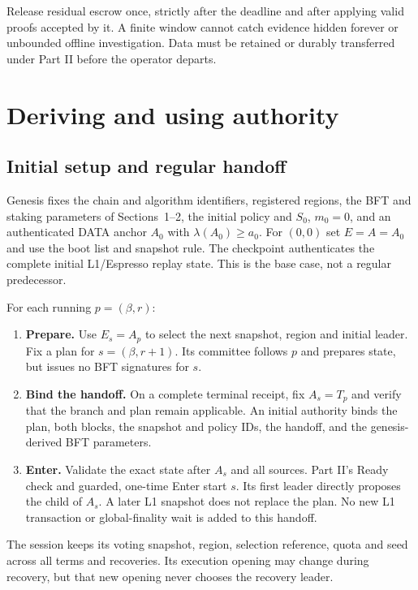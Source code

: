\documentclass[11pt,a4paper]{article}
\begin{document}
Release residual escrow once, strictly after the deadline and after
applying valid proofs accepted by it. A finite window cannot catch evidence
hidden forever or unbounded offline investigation. Data must be retained
or durably transferred under Part II before the operator departs.

\newpage
\section{Deriving and using authority}
\label{sec:authority}
\subsection{Initial setup and regular handoff}
Genesis fixes the chain and algorithm identifiers, registered regions,
the BFT and staking parameters of Sections~1--2, the initial policy and
$S_0$, $m_0=0$, and an authenticated DATA anchor $A_0$ with
$\lambda(A_0)\ge a_0$. For $(0,0)$ set $E=A=A_0$ and use the boot list
and snapshot rule. The checkpoint authenticates the complete initial
L1/Espresso replay state. This is the base case, not a regular predecessor.

For each running $p=(\beta,r)$:
\begin{enumerate}[label=\textbf{\arabic*.},itemsep=4pt]
\item \textbf{Prepare.} Use $E_s=A_p$ to select the next snapshot, region
and initial leader. Fix a plan for $s=(\beta,r+1)$. Its committee follows
$p$ and prepares state, but issues no BFT signatures for $s$.
\item \textbf{Bind the handoff.} On a complete terminal receipt, fix
$A_s=T_p$ and verify that the branch and plan remain applicable. An
initial authority binds the plan, both blocks, the snapshot and policy
IDs, the handoff, and the genesis-derived BFT parameters.
\item \textbf{Enter.} Validate the exact state after $A_s$ and all sources.
Part II's Ready check and guarded, one-time Enter start $s$. Its first
leader directly proposes the child of $A_s$. A later L1 snapshot does
not replace the plan. No new L1 transaction or global-finality wait is
added to this handoff.
\end{enumerate}

The session keeps its voting snapshot, region, selection reference, quota
and seed across all terms and recoveries. Its execution opening may change
during recovery, but that new opening never chooses the recovery leader.
\end{document}
